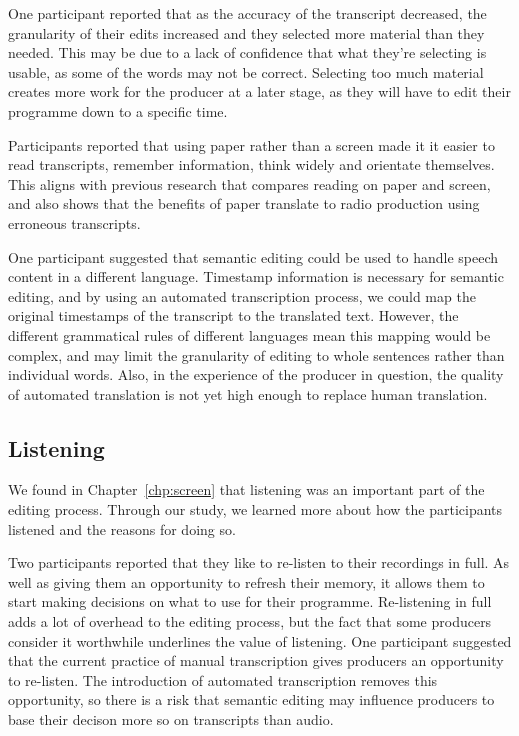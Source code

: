 One participant reported that as the accuracy of the transcript decreased, the granularity of their edits increased
and they selected more material than they needed. This may be due to a lack of confidence that what they're selecting is
usable, as some of the words may not be correct. Selecting too much material creates more work for the producer at a
later stage, as they will have to edit their programme down to a specific time.

Participants reported that using paper rather than a screen made it it easier to read transcripts, remember
information, think widely and orientate themselves. This aligns with previous research that compares reading on paper
and screen, and also shows that the benefits of paper translate to radio production using erroneous transcripts.

One participant suggested that semantic editing could be used to handle speech content in a different language.
Timestamp information is necessary for semantic editing, and by using an automated transcription process, we could map
the original timestamps of the transcript to the translated text.  However, the different grammatical rules of
different languages mean this mapping would be complex, and may limit the granularity of editing to whole sentences
rather than individual words.  Also, in the experience of the producer in question, the quality of automated
translation is not yet high enough to replace human translation. 

\subsection{Listening}

We found in Chapter~\ref{chp:screen} that listening was an important part of the editing process. Through our study, we
learned more about how the participants listened and the reasons for doing so.

Two participants reported that they like to re-listen to their recordings in full. As well as giving them an
opportunity to refresh their memory, it allows them to start making decisions on what to use for their programme.
Re-listening in full adds a lot of overhead to the editing process, but the fact that some producers consider it
worthwhile underlines the value of listening. One participant suggested that the current practice of manual
transcription gives producers an opportunity to re-listen. The introduction of automated transcription removes this
opportunity, so there is a risk that semantic editing may influence producers to base their decison more so on
transcripts than audio.

